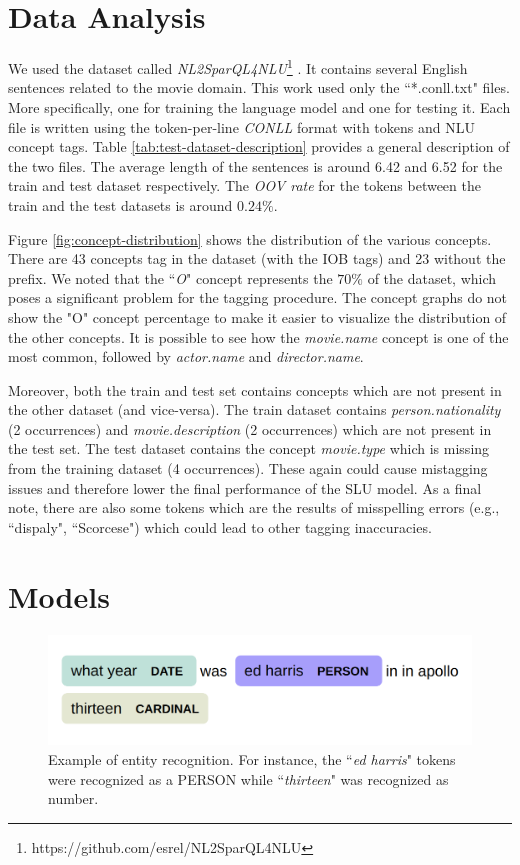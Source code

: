 \documentclass[11pt,a4paper]{article}
\begin{document}
\section{Data Analysis}

We used the dataset called \textit{NL2SparQL4NLU}\footnote{https://github.com/esrel/NL2SparQL4NLU} \citep{Chen2014DerivingLR, gobbi2018concept}. It contains several English sentences related to the movie domain. This work used only the ``*.conll.txt" files. More specifically, one for training the language model and one for testing it. Each file is written using the token-per-line \textit{CONLL} format with tokens and NLU concept tags. Table \ref{tab:test-dataset-description} provides a general description of the two files. The average length of the sentences is around 6.42 and 6.52 for the train and test dataset respectively. The \textit{OOV rate} for the tokens between the train and the test datasets is around $0.24\%$.


Figure \ref{fig:concept-distribution} shows the distribution of the various concepts. There are 43 concepts tag in the dataset (with the IOB tags) and 23 without the prefix. We noted that the ``\textit{O}" concept represents the $70\%$ of the dataset, which poses a significant problem for the tagging procedure. The concept graphs do not show the "O" concept percentage to make it easier to visualize the distribution of the other concepts. It is possible to see how the \textit{movie.name} concept is one of the most common, followed by \textit{actor.name} and \textit{director.name}.


Moreover, both the train and test set contains concepts which are not present in the other dataset (and vice-versa). The train dataset contains \textit{person.nationality} (2 occurrences) and \textit{movie.description} (2 occurrences) which are not present in the test set. The test dataset contains the concept \textit{movie.type} which is missing from the training dataset (4 occurrences). These again could cause mistagging issues and therefore lower the final performance of the SLU model. 
As a final note, there are also
some tokens which are the results of misspelling errors (e.g., ``dispaly", ``Scorcese") which could lead to other tagging inaccuracies.



\section{Models}

\begin{figure}[b!]
\centering
	\includegraphics[width=1\linewidth]{img/entity}
	\caption{Example of entity recognition. For instance, the ``\textit{ed harris}" tokens were recognized as a PERSON while ``\textit{thirteen}" was recognized as number.}
	\label{fig:entity-recognition}
\end{figure}
\end{document}
